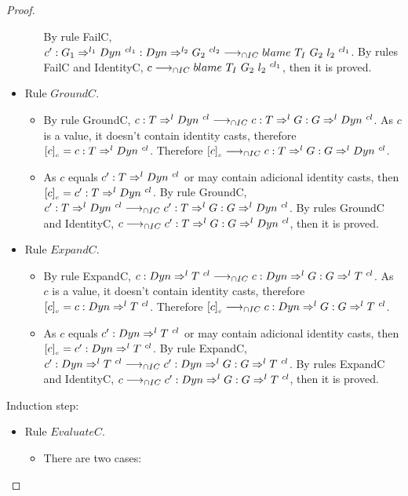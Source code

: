 \documentclass[a4paper]{article}
\begin{document}
\begin{proof}
\begin{itemize}
\begin{itemize}
        By rule FailC, $c' : G_1 \Rightarrow^{l_1} \Dyn\ ^{cl_1} : \Dyn \Rightarrow^{l_2} G_2\ ^{cl_2} \icos \blamecast{T_I}{G_2}{l_2}{cl_1}$.
        By rules FailC and IdentityC, $c \longrightarrow_{\cap IC} blame\ T_I\ G_2\ l_2\ ^{cl_1}$, then it is proved.
    \end{itemize}
    \item Rule $GroundC$.
    \begin{itemize}
        \item By rule GroundC, $c : T \Rightarrow^l \Dyn\ ^{cl} \icos c : T \Rightarrow^l G : G \Rightarrow^l \Dyn\ ^{cl}$.
        As $c$ is a value, it doesn't contain identity casts, therefore $\erasec{c} = c : T \Rightarrow^l \Dyn\ ^{cl}$.
        Therefore $[c]_{_c} \longrightarrow_{\cap IC} c : T \Rightarrow^l G : G \Rightarrow^l Dyn\ ^{cl}$.
        \item As $c$ equals $c' : T \Rightarrow^l \Dyn\ ^{cl}$ or may contain adicional identity casts, then $\erasec{c} = c' : T \Rightarrow^l \Dyn\ ^{cl}$.
        By rule GroundC, $c' : T \Rightarrow^l Dyn\ ^{cl} \longrightarrow_{\cap IC} c' : T \Rightarrow^l G : G \Rightarrow^l Dyn\ ^{cl}$.
        By rules GroundC and IdentityC, $c \longrightarrow_{\cap IC} c' : T \Rightarrow^l G : G \Rightarrow^l Dyn\ ^{cl}$, then it is proved.
    \end{itemize}
    \item Rule $ExpandC$.
    \begin{itemize}
        \item By rule ExpandC, $c : Dyn \Rightarrow^l T\ ^{cl} \longrightarrow_{\cap IC} c : Dyn \Rightarrow^l G : G \Rightarrow^l T\ ^{cl}$.
        As $c$ is a value, it doesn't contain identity casts, therefore $\erasec{c} = c : \Dyn \Rightarrow^l T\ ^{cl}$.
        Therefore $[c]_{_c} \longrightarrow_{\cap IC} c : Dyn \Rightarrow^l G : G \Rightarrow^l T\ ^{cl}$.
        \item As $c$ equals $c' : \Dyn \Rightarrow^l T\ ^{cl}$ or may contain adicional identity casts, then $\erasec{c} = c' : \Dyn \Rightarrow^l T\ ^{cl}$.
        By rule ExpandC, $c' : Dyn \Rightarrow^l T\ ^{cl} \longrightarrow_{\cap IC} c' : Dyn \Rightarrow^l G : G \Rightarrow^l T\ ^{cl}$.
        By rules ExpandC and IdentityC, $c \longrightarrow_{\cap IC} c' : Dyn \Rightarrow^l G : G \Rightarrow^l T\ ^{cl}$, then it is proved.
    \end{itemize}
\end{itemize}
Induction step:
\begin{itemize}
    \item Rule $EvaluateC$.
    \begin{itemize}
        \item There are two cases:

\end{itemize}
\end{itemize}
\end{proof}
\end{document}

